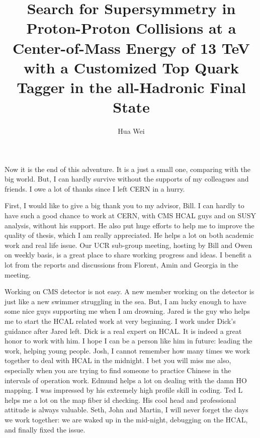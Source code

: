 \documentclass[oneside,final,letterpaper]{ucr}
\begin{document}

\title{Search for Supersymmetry in Proton-Proton Collisions at a Center-of-Mass Energy of 13 TeV with a Customized Top Quark Tagger in the all-Hadronic Final State}
\author{Hua Wei}

\maketitle
\copyrightpage{}
\approvalpage{}

\begin{frontmatter}

\begin{acknowledgements}
Now it is the end of this adventure. It is a just a small one, comparing with the big world. But, I can hardly survive without the supports of my colleagues and friends. I owe a lot of thanks since I left CERN in a hurry. 

First, I would like to give a big thank you to my advisor, Bill. I can hardly to have such a good chance to work at CERN, with CMS HCAL guys and on SUSY analysis, without his support. He also put huge efforts to help me to improve the quality of thesis, which I am really appreciated. He helps a lot on both academic work and real life issue. Our UCR sub-group meeting, hosting by Bill and Owen on weekly basis, is a great place to share working progress and ideas. I benefit a lot from the reports and discussions from Florent, Amin and Georgia in the meeting. 

Working on CMS detector is not easy. A new member working on the detector is just like a new swimmer struggling in the sea. But, I am lucky enough to have some nice guys supporting me when I am drowning. Jared is the guy who helps me to start the HCAL related work at very beginning. I work under Dick's guidance after Jared left. Dick is a real expert on HCAL. It is indeed a great honor to work with him. I hope I can be a person like him in future: leading the work, helping young people. Josh, I cannot remember how many times we work together to deal with HCAL in the midnight. I bet you will miss me also, especially when you are trying to find someone to practice Chinese in the intervals of operation work. Edmund helps a lot on dealing with the damn HO mapping. I was impressed by his extremely high profile skill in coding. Ted L helps me a lot on the map fiber id checking. His cool head and professional attitude is always valuable. Seth, John and Martin, I will never forget the days we work together: we are waked up in the mid-night, debugging on the HCAL, and finally fixed the issue. 


\end{acknowledgements}
\end{frontmatter}
\end{document}
